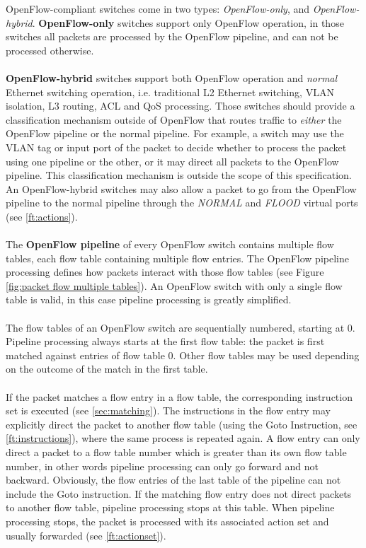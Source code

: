\documentclass[10pt]{article}
\begin{document}
OpenFlow-compliant switches come in two types: \emph{OpenFlow-only}, and \emph{OpenFlow-hybrid}. \textbf{OpenFlow-only} switches support only OpenFlow operation, in those switches all packets are processed by the OpenFlow pipeline, and can not be processed otherwise.
\\\\
\textbf{OpenFlow-hybrid} switches support both OpenFlow operation and \emph{normal} Ethernet switching operation, i.e. traditional L2 Ethernet switching, VLAN isolation, L3 routing, ACL and QoS processing. Those switches should provide a classification mechanism outside of OpenFlow that routes traffic to \emph{either} the OpenFlow pipeline or the normal pipeline. For example, a switch may use the VLAN tag or input port of the packet to decide whether to process the packet using one pipeline or the other, or it may direct all packets to the OpenFlow pipeline. This classification mechanism is outside the scope of this specification. An OpenFlow-hybrid switches may also allow a packet to go from the OpenFlow pipeline to the normal pipeline through the \emph{NORMAL} and \emph{FLOOD} virtual ports (see \ref{ft:actions}).
\\\\
The \textbf{OpenFlow pipeline} of every OpenFlow switch contains multiple flow tables, each flow table containing multiple flow entries. The OpenFlow pipeline processing defines how packets interact with those flow tables (see Figure \ref{fig:packet flow multiple tables}). An OpenFlow switch with only a single flow table is valid, in this case pipeline processing is greatly simplified.
\\\\
The flow tables of an OpenFlow switch are sequentially numbered, starting at 0. Pipeline processing always starts at the first flow table: the packet is first matched against entries of flow table 0. Other flow tables may be used depending on the outcome of the match in the first table.
\\\\
If the packet matches a flow entry in a flow table, the corresponding instruction set is executed (see \ref{sec:matching}). The instructions in the flow entry may explicitly direct the packet to another flow table (using the Goto Instruction, see \ref{ft:instructions}), where the same process is repeated again. A flow entry can only direct a packet to a flow table number which is greater than its own flow table number, in other words pipeline processing can only go forward and not backward. Obviously, the flow entries of the last table of the pipeline can not include the Goto instruction. If the matching flow entry does not direct packets to another flow table, pipeline processing stops at this table. When pipeline processing stops, the packet is processed with its associated action set and usually forwarded (see \ref{ft:actionset}).
\end{document}
